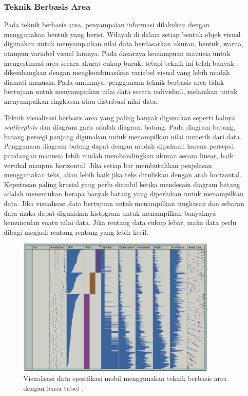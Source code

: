 \subsubsection{Teknik Berbasis Area}
Pada teknik berbasis area, penyampaian informasi dilakukan dengan menggunakan bentuk yang berisi. Wilayah di dalam setiap bentuk objek visual digunakan untuk menyampaikan nilai data berdasarkan ukuran, bentuk, warna, ataupun variabel visual lainnya. Pada dasarnya kemampuan manusia untuk mengestimasi area secara akurat cukup buruk, tetapi teknik ini telah banyak dikembangkan dengan mengkombinasikan variabel visual yang lebih mudah diamati manusia. Pada umumnya, penggunaan teknik berbasis area tidak bertujuan untuk menyampaikan nilai data secara individual, melainkan untuk menyampaikan ringkasan atau distribusi nilai data. \par 
Teknik visualisasi berbasis area yang paling banyak digunakan seperti halnya \textit{scatterplots} dan diagram garis adalah diagram batang. Pada diagram batang, batang persegi panjang digunakan untuk menampilkan nilai numerik dari data. Penggunaan diagram batang dapat dengan mudah dipahami karena persepsi pandangan manusia lebih mudah membandingkan ukuran secara linear, baik vertikal maupun horizontal. Jika setiap bar membutuhkan penjelasan menggunakan teks, akan lebih baik jika teks dituliskan dengan arah horizontal. Keputusan paling krusial yang perlu diambil ketika mendesain diagram batang adalah menentukan berapa banyak batang yang diperlukan untuk menampilkan data. Jika visualisasi data bertujuan untuk menampilkan ringkasan dan sebaran data maka dapat digunakan histogram untuk menampilkan banyaknya kemunculan suatu nilai data. Jika rentang data cukup lebar, maka data perlu dibagi menjadi rentang-rentang yang lebih kecil. \par 
\begin{figure}[b!]
    \centering
    \includegraphics[width=10cm]{Gambar/datamobil-visual-area.jpg}
    \caption{Visualisasi data spesifikasi mobil menggunakan teknik berbasis area dengan lensa tabel \cite{buku_visual}.}
    \label{fig:datamobil-visual-area}
\end{figure}
